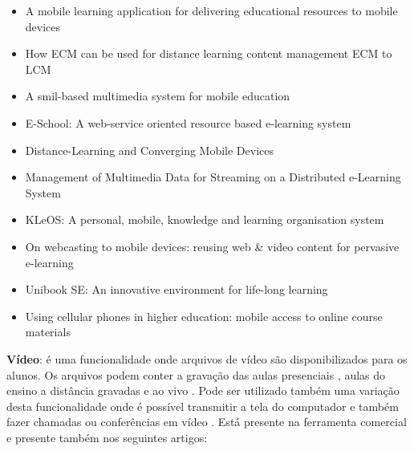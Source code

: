 \vspace{-5mm}
\begin{itemize}
    \item A mobile learning application for delivering educational resources to mobile devices \cite{boyinbode_mobile_2012}
    \item How ECM can be used for distance learning content management ECM to LCM \cite{daoudi_how_2012}
    \item A smil-based multimedia system for mobile education \cite{di_smil-based_2009}
    \item E-School: A web-service oriented resource based e-learning system \cite{sultana_e-school:_2010}
    \item Distance-Learning and Converging Mobile Devices \cite{hoganson_distance-learning_2009}
    \item Management of Multimedia Data for Streaming on a Distributed e-Learning System \cite{hayakawa_management_2012}
    \item KLeOS: A personal, mobile, knowledge and learning organisation system \cite{vavoula_kleos:_2002}
    \item On webcasting to mobile devices: reusing web \& video content for pervasive e-learning \cite{turro_webcasting_2007}
    \item Unibook SE: An innovative environment for life-long learning \cite{chimos_unibook_2012}
    \item Using cellular phones in higher education: mobile access to online course materials \cite{mermelstein_using_2005}
\end{itemize}

\textbf{Vídeo}: é uma funcionalidade onde arquivos de vídeo são disponibilizados para os alunos. Os arquivos podem conter a gravação das aulas presenciais \cite{mermelstein_using_2005}, aulas do ensino a distância gravadas e ao vivo \cite{hoganson_distance-learning_2009, turro_webcasting_2007, chimos_unibook_2012, rodriguez-alsina_unified_2010}. Pode ser utilizado também uma variação desta funcionalidade onde é possível transmitir a tela do computador e também fazer chamadas ou conferências em vídeo \cite{chimos_unibook_2012}. Está presente na ferramenta comercial  e presente também nos seguintes artigos: 

